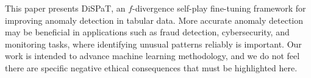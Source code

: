 \documentclass{article}
\theoremstyle{plain}
\theoremstyle{definition}
\theoremstyle{remark}
\begin{document}
This paper presents DiSPaT, an $f$-divergence self-play fine-tuning framework for improving anomaly detection in tabular data. More accurate anomaly detection may be beneficial in applications such as fraud detection, cybersecurity, and monitoring tasks, where identifying unusual patterns reliably is important. Our work is intended to advance machine learning methodology, and we do not feel there are specific negative ethical consequences that must be highlighted here.



\newpage
\appendix
\onecolumn

\end{document}
